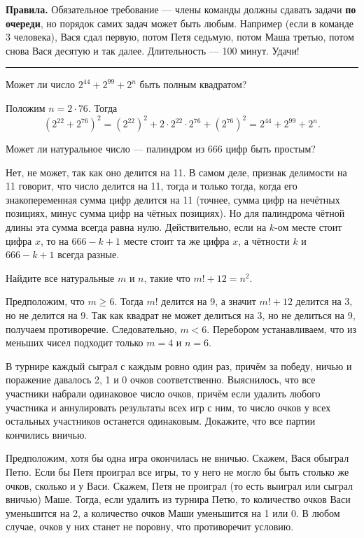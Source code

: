 \documentclass[a4paper,12pt]{article}
\begin{document}
    \textbf{Правила.} Обязательное требование --- члены команды должны сдавать задачи \textbf{по очереди}, но порядок самих задач может быть любым. Например (если в команде 3 человека), Вася сдал первую, потом Петя седьмую, потом Маша третью, потом снова Вася десятую и так далее. Длительность --- 100 минут. Удачи!
    \vspace{5pt}
    \hrule
    \vspace{5pt}
    
    \problem Может ли число $2^{44} + 2^{99} + 2^n$ быть полным квадратом?
\begin{solution}
    Положим $n = 2 \cdot 76$. Тогда
    \begin{equation*}
        (2^{22} + 2^{76})^2 = (2^{22})^2 + 2 \cdot 2^{22} \cdot 2^{76} + (2^{76})^2 = 2^{44} + 2^{99} + 2^n.
    \end{equation*}
\end{solution}
    \problem Может ли натуральное число --- палиндром из 666 цифр быть простым?
    \begin{solution}
        Нет, не может, так как оно делится на 11. В самом деле, признак делимости на 11  говорит, что число делится на 11, тогда и только тогда, когда его знакопеременная сумма цифр делится на 11 (точнее, сумма цифр на нечётных позициях, минус сумма цифр на чётных позициях). Но для палиндрома чётной длины эта сумма всегда равна нулю. Действительно, если на $k$-ом месте стоит цифра $x$, то на $666 - k + 1$ месте стоит та же цифра $x$, а чётности $k$ и $666 - k + 1$ всегда разные.
    \end{solution}
    
    \problem Найдите все натуральные $m$ и $n$, такие что $m! + 12 = n^2$.
    \begin{solution}
        Предположим, что $m \geq 6$. Тогда $m!$ делится на 9, а значит $m! + 12$ делится на 3, но не делится на 9. Так как квадрат не может делиться на 3, но не делиться на 9, получаем противоречие. Следовательно, $m < 6$. Перебором устанавливаем, что из меньших чисел подходит только $m = 4$ и $n = 6$.
    \end{solution}
    \problem В турнире каждый сыграл с каждым ровно один раз, причём за победу, ничью и поражение давалось 2, 1 и 0 очков соответственно. Выяснилось, что все участники набрали одинаковое число очков, причём если удалить любого участника и аннулировать результаты всех игр с ним, то число очков у всех остальных участников останется одинаковым. Докажите, что все партии кончились вничью.
    \begin{solution}
        Предположим, хотя бы одна игра окончилась не вничью. Скажем, Вася обыграл Петю. Если бы Петя проиграл все игры, то у него не могло бы быть столько же очков, сколько и у Васи. Скажем, Петя не проиграл (то есть выиграл или сыграл вничью) Маше. Тогда, если удалить из турнира Петю, то количество очков Васи уменьшится на 2, а количество очков Маши уменьшится на 1 или 0. В любом случае, очков у них станет не поровну, что противоречит условию.
    \end{solution}
    
\end{document}
